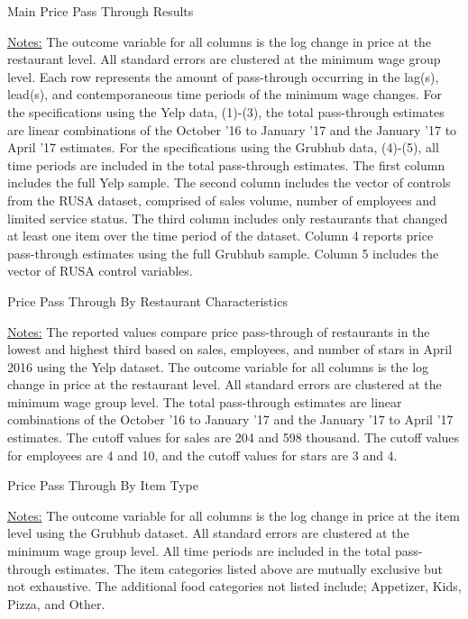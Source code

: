 \documentclass[11pt]{article}
\begin{document}
\begin{table}
\centering
\caption{Main Price Pass Through Results}


{\footnotesize \raggedright \underline{Notes:}  
The outcome variable for all columns is the log change in price at the restaurant level. All standard errors are clustered at the minimum wage group level. Each row represents the amount of pass-through occurring in the lag(s), lead(s), and contemporaneous time periods of the minimum wage changes. For the specifications using the Yelp data, (1)-(3), the total pass-through estimates are linear combinations of the October '16 to January '17 and the January '17 to April '17 estimates. For the specifications using the Grubhub data, (4)-(5), all time periods are included in the total pass-through estimates. The first column includes the full Yelp sample. The second column includes the vector of controls from the RUSA dataset, comprised of sales volume, number of employees and limited service status. The third column includes only restaurants that changed at least one item over the time period of the dataset. Column 4 reports price pass-through estimates using the full Grubhub sample. Column 5 includes the vector of RUSA control variables.   \par
}
\end{table}



\begin{table}
\centering
\caption{Price Pass Through By Restaurant Characteristics}

{\footnotesize \raggedright \underline{Notes:} 
The reported values compare price pass-through of restaurants in the lowest and highest third based on sales, employees, and number of stars in April 2016 using the Yelp dataset. The outcome variable for all columns is the log change in price at the restaurant level. All standard errors are clustered at the minimum wage group level. The total pass-through estimates are linear combinations of the October '16 to January '17 and the January '17 to April '17 estimates.  The cutoff values for sales are 204 and 598 thousand. The cutoff values for employees are 4 and 10, and the cutoff values for stars are 3 and 4. \par
}
\end{table}

\begin{landscape}
\begin{table}
\centering
\caption{Price Pass Through By Item Type}

{\footnotesize \raggedright \underline{Notes:} 
The outcome variable for all columns is the log change in price at the item level using the Grubhub dataset. All standard errors are clustered at the minimum wage group level. All time periods are included in the total pass-through estimates. The item categories listed above are mutually exclusive but not exhaustive. The additional food categories not listed include; Appetizer, Kids, Pizza, and Other. \par
}
\end{table}
\end{landscape}
\end{document}
